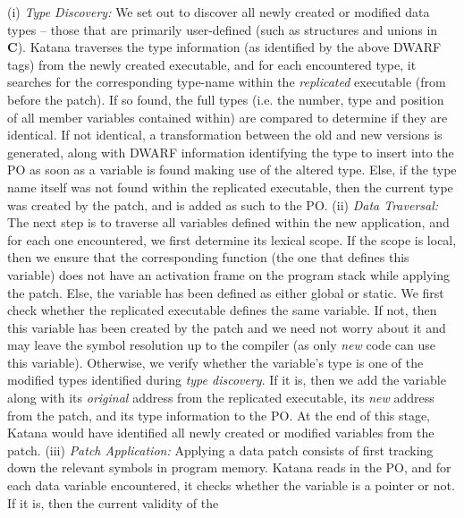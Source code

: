 (i) {\it Type Discovery:} We set out to discover all newly created or
modified data types -- those that are primarily user-defined (such as
structures and unions in {\bf C}). Katana traverses the type information
(as identified by the above DWARF tags) from the newly created executable,
 and for each encountered type, it searches for
the corresponding type-name within the {\it replicated} executable
(from before the patch). If so found, the full types (i.e. the number,
type and position of all member variables contained within) are
compared to determine if they are identical. If not identical,
a transformation between the old and new versions is generated, along
with DWARF information identifying the type to insert into the PO as
soon as a variable is found making use of the altered type.
 Else, if
the type name itself was not found within the replicated executable, then the
current type was created by the patch, and is added as such to the PO.
\newline
(ii) {\it Data Traversal:} The next step is to traverse all variables
defined within the new application, and for each one encountered,
we first determine its 
lexical scope.
If the scope is
local, then we ensure that the corresponding function (the one that
defines this variable) does not have an activation frame on  
the program stack while
applying the patch. Else, the variable has been defined as either
global or static. We first check whether the replicated executable defines
the same variable. If not, then this variable has been created by the
patch and we need not worry about it and may leave the symbol
resolution up to
the compiler (as only {\it new} code can use this variable). Otherwise,
we verify whether the variable's type is one of the
modified types identified during {\it type discovery}. If it is, then
we add the variable along with its {\it original} address from the replicated
executable, its {\it new} address from the patch, and its type information to the
PO. At the end of this stage, Katana would have identified all newly
created or modified variables from the patch. 
\newline
(iii) {\it Patch Application: } Applying a data patch consists of
first tracking down the relevant symbols in program memory. Katana
reads in the PO, and for each data variable encountered, it checks whether
the variable is a pointer or not. If it is, then the current validity of the
